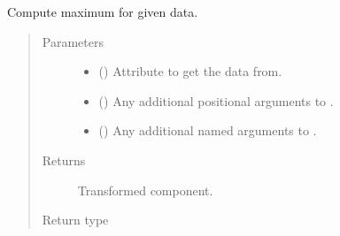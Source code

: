 \documentclass[letterpaper,10pt,english]{sphinxmanual}
\begin{document}
\begin{fulllineitems}
\begin{fulllineitems}
\label{\detokenize{api/base_classes:geology.src.base_spatial.SpatialComponent.maximum}}
Compute maximum for given data.
\begin{quote}\begin{description}
\item[{Parameters}] \leavevmode\begin{itemize}
\item {} 
 (\sphinxstyleliteralemphasis{\sphinxupquote{, }}) \textendash{} Attribute to get the data from.

\item {} 
 () \textendash{} Any additional positional arguments to .

\item {} 
 () \textendash{} Any additional named arguments to .

\end{itemize}

\item[{Returns}] \leavevmode
{} \textendash{} Transformed component.

\item[{Return type}] \leavevmode
{\hyperref[\detokenize{api/base_classes:geology.src.base_spatial.SpatialComponent}]{}}

\end{description}\end{quote}

\end{fulllineitems}



\end{fulllineitems}
\end{document}
